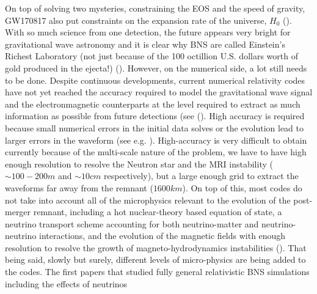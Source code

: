On top of solving two mysteries, constraining the EOS and the speed of gravity, GW170817 also put constraints on the expansion rate of the universe, $H_0$ (\cite{ligo2017gravitational}). With so much science from one detection, the future appears very bright for gravitational wave astronomy and it is clear why BNS are called Einstein's Richest Laboratory (not just because of the 100 octillion U.S. dollars worth of gold produced in the ejecta!) (\cite{baiotti2016binary}). However, on the numerical side, a lot still needs to be done. Despite continuous developments, current numerical relativity codes have not yet reached the accuracy required to model the gravitational wave signal and the electronmagnetic counterparts at the level required to extract as much information as possible from future detections (see (\cite{baiotti2016binary}). High accuracy is required because small numerical errors in the initial data solves or the evolution lead to larger errors in the waveform (see e.g. \cite{tsokaros2016initialfixed}). High-accuracy is very difficult to obtain currently because of the multi-scale nature of the problem, we have to have high enough resolution to resolve the Neutron star and the MRI instability ($\sim 100-200m$ and $\sim 10cm$ respectively), but a large enough grid to extract the waveforms far away from the remnant ($1600 km$). On top of this, most codes do not take into account all of the microphysics relevant to the evolution of the post-merger remnant, including a hot nuclear-theory based equation of state, a neutrino transport scheme accounting for both neutrino-matter and neutrino-neutrino interactions, and the evolution of the magnetic fields with enough resolution to resolve the growth of magneto-hydrodynamics instabilities (\cite{foucart2015low}). That being said, slowly but surely, different levels of micro-physics are being added to the codes. The first papers that studied fully general relativistic BNS simulations including the effects of neutrinos
